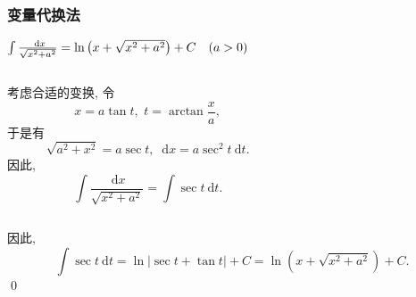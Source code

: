 \documentclass[
10pt,
aspectratio=43,
]{beamer}
\begin{document}
\begin{frame}
	\frametitle{变量代换法}
	\everymath{\displaystyle}
	{\small
		\begin{exampleblock}{$\color{black}\int \frac{\mathrm{~d} x}{\sqrt{x^2+a^2}}=\ln \left(x+\sqrt{x^2+a^2}\right)+C \quad(a>0)$}
			\begin{columns}
				\begin{column}{0.4\textwidth}
					\pause 考虑合适的变换, 令
					$$
						x=a \tan t,\,\,t=\arctan\frac{x}{a},
					$$
					\pause 于是有
					$$
						\sqrt{a^2+x^2} = a\sec t,\,\,\mathrm{~d} x=a \sec ^2 t \mathrm{~d} t.
					$$
					\pause 因此,
					$$
						\int \frac{\mathrm{~d} x}{\sqrt{x^2+a^2}}=\int \sec t \mathrm{~d} t.
					$$
				\end{column}
				\pause
				\begin{column}{0.5\textwidth}
					\begin{figure}
						\centering
					\end{figure}
				\end{column}
			\end{columns}
			\vspace{0.1cm}
			\pause
			因此,
			$$
				\int \sec t \mathrm{~d} t= \ln |\sec t+\tan t|+C=\ln \left(x+\sqrt{x^2+a^2}\right)+C.
			$$
			\qed
		\end{exampleblock}
	}
\end{frame}
\end{document}
